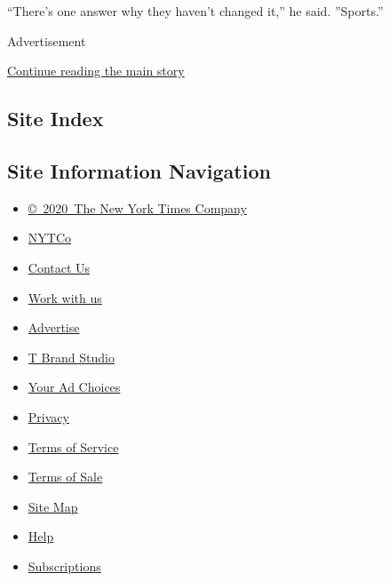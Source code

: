 ``There's one answer why they haven't changed it,'' he said. ''Sports.''

Advertisement

\protect\hyperlink{after-bottom}{Continue reading the main story}

\hypertarget{site-index}{%
\subsection{Site Index}\label{site-index}}

\hypertarget{site-information-navigation}{%
\subsection{Site Information
Navigation}\label{site-information-navigation}}

\begin{itemize}
\tightlist
\item
  \href{https://help.nytimes.com/hc/en-us/articles/115014792127-Copyright-notice}{©~2020~The
  New York Times Company}
\end{itemize}

\begin{itemize}
\tightlist
\item
  \href{https://www.nytco.com/}{NYTCo}
\item
  \href{https://help.nytimes.com/hc/en-us/articles/115015385887-Contact-Us}{Contact
  Us}
\item
  \href{https://www.nytco.com/careers/}{Work with us}
\item
  \href{https://nytmediakit.com/}{Advertise}
\item
  \href{http://www.tbrandstudio.com/}{T Brand Studio}
\item
  \href{https://www.nytimes.com/privacy/cookie-policy\#how-do-i-manage-trackers}{Your
  Ad Choices}
\item
  \href{https://www.nytimes.com/privacy}{Privacy}
\item
  \href{https://help.nytimes.com/hc/en-us/articles/115014893428-Terms-of-service}{Terms
  of Service}
\item
  \href{https://help.nytimes.com/hc/en-us/articles/115014893968-Terms-of-sale}{Terms
  of Sale}
\item
  \href{https://spiderbites.nytimes.com}{Site Map}
\item
  \href{https://help.nytimes.com/hc/en-us}{Help}
\item
  \href{https://www.nytimes.com/subscription?campaignId=37WXW}{Subscriptions}
\end{itemize}
